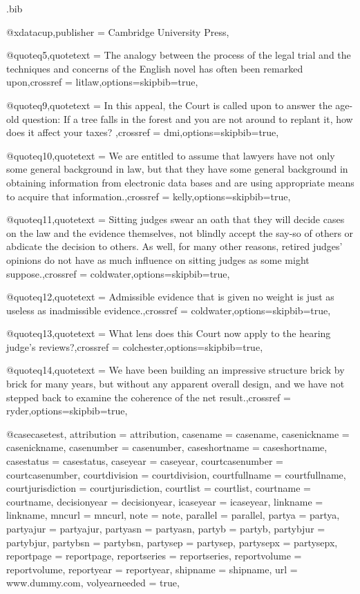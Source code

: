 \begin{filecontents*}[overwrite]{\jobname.bib}


@xdata{cup,publisher =  {Cambridge University Press},}

@quote{q5,quotetext =  {The analogy between the process of the legal trial and the techniques and concerns of the English novel has often been remarked upon},crossref =  {litlaw},options={skipbib=true},}

@quote{q9,quotetext =  { In this appeal, the Court is called upon to answer the age-old question:  If a tree falls in the forest and you are not around to replant it, how does it affect your taxes? },crossref =  {dmi},options={skipbib=true},}

@quote{q10,quotetext =  {We are entitled to assume that lawyers have not only some general background in law, but that they have some general background in obtaining information from electronic data bases and are using appropriate means to acquire that information.},crossref =  {kelly},options={skipbib=true},}

@quote{q11,quotetext =  {Sitting judges swear an oath that they will decide cases on the law and the evidence themselves, not blindly accept the say-so of others or abdicate the decision to others. As well, for many other reasons, retired judges’ opinions do not have as much influence on sitting judges as some might suppose.},crossref =  {coldwater},options={skipbib=true},}

@quote{q12,quotetext =  {Admissible evidence that is given no weight is just as useless as inadmissible evidence.},crossref =  {coldwater},options={skipbib=true},}

@quote{q13,quotetext =  {What lens does this Court now apply to the hearing judge’s reviews?},crossref =  {colchester},options={skipbib=true},}

@quote{q14,quotetext =  {We have been building an impressive structure brick by brick for many years, but without any apparent overall design, and we have not stepped back to examine the coherence of the net result.},crossref =  {ryder},options={skipbib=true},}


@case{casetest,
attribution = {attribution},
casename = {casename},
casenickname = {casenickname},
casenumber = {casenumber},
caseshortname = {caseshortname},
casestatus = {casestatus},
caseyear = {caseyear},
courtcasenumber = {courtcasenumber},
courtdivision = {courtdivision},
courtfullname = {courtfullname},
courtjurisdiction = {courtjurisdiction},
courtlist = {courtlist},
courtname = {courtname},
decisionyear = {decisionyear},
icaseyear = {icaseyear},
linkname = {linkname},
mncurl = {mncurl},
note = {note},
parallel = {parallel},
partya = {partya},
partyajur = {partyajur},
partyasn = {partyasn},
partyb = {partyb},
partybjur = {partybjur},
partybsn = {partybsn},
partysep = {partysep},
partysepx = {partysepx},
reportpage = {reportpage},
reportseries = {reportseries},
reportvolume = {reportvolume},
reportyear = {reportyear},
shipname = {shipname},
url = {www.dummy.com},
volyearneeded = {true},
}


\end{filecontents*}
